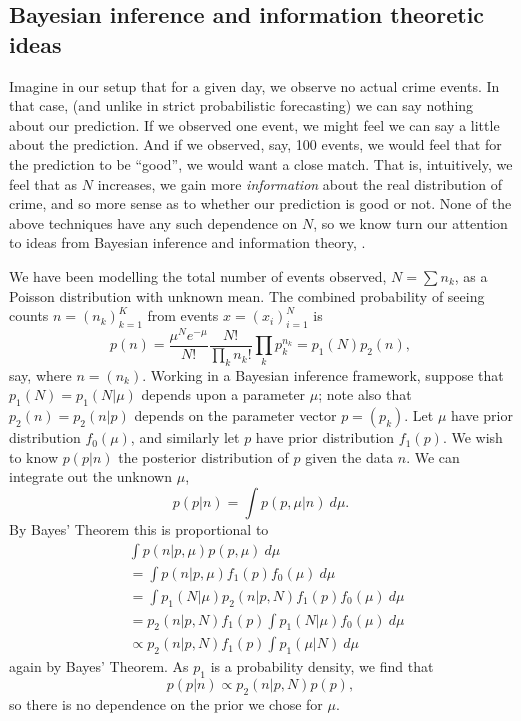 \documentclass[twoside,a4paper,twocolumn,10pt]{article}
\theoremstyle{plain}
\theoremstyle{definition}
\begin{document}
\subsection{Bayesian inference and information theoretic ideas}\label{sec:info}

Imagine in our setup that for a given day, we observe no actual crime events.  In that case,
(and unlike in strict probabilistic forecasting) we can say nothing about our prediction.
If we observed one event, we might feel we can say a little about the prediction.  And if we
observed, say, 100 events, we would feel that for the prediction to be ``good'', we would want
a close match.  That is, intuitively, we feel that as $N$ increases, we gain more
\emph{information} about the real distribution of crime, and so more sense as to whether our
prediction is good or not.  None of the above techniques have any such dependence on $N$, so
we know turn our attention to ideas from Bayesian inference and information theory, \cite{gcsr,
mackay}.

We have been modelling the total number of events observed, $N = \sum n_k$, as a
Poisson distribution with unknown mean.
The combined probability of seeing counts $n=(n_k)_{k=1}^K$ from events $x=(x_i)_{i=1}^N$ is
\[ p(n) = \frac{\mu^N e^{-\mu}}{N!} \frac{N!}{\prod_k n_k!} \prod_k p_k^{n_k}
= p_1(N) p_2(n), \]
say, where $n = (n_k)$.  Working in a Bayesian inference framework, suppose that $p_1(N) =
p_1(N|\mu)$ depends upon a parameter $\mu$; note also that $p_2(n) = p_2(n|p)$ depends
on the parameter vector $p = (p_k)$.  Let $\mu$ have prior distribution $f_0(\mu)$, and similarly
let $p$ have prior distribution $f_1(p)$.  We wish to know $p(p|n)$ the posterior distribution
of $p$ given the data $n$.  We can integrate out the unknown $\mu$,
\[ p(p|n) = \int p(p,\mu | n) \ d\mu. \]
By Bayes' Theorem this is proportional to
\begin{align*}
& \int p(n|p,\mu) p(p,\mu) \ d\mu \\
&= \int p(n|p,\mu) f_1(p) f_0(\mu) \ d\mu \\
&= \int p_1(N|\mu) p_2(n|p,N) f_1(p) f_0(\mu) \ d\mu \\
&= p_2(n|p,N) f_1(p) \int p_1(N|\mu) f_0(\mu) \ d\mu \\
&\propto p_2(n|p,N) f_1(p) \int p_1(\mu|N) \ d\mu
\end{align*}
again by Bayes' Theorem.  As $p_1$ is a probability density, we find that
\[ p(p|n) \propto p_2(n|p,N) p(p), \]
so there is no dependence on the prior we chose for $\mu$.
\end{document}
